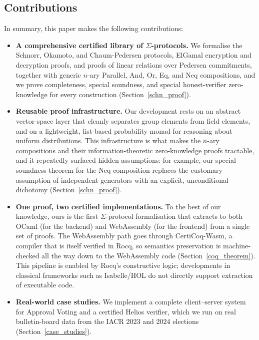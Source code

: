 \documentclass[sigconf,anonymous,review]{acmart}
\begin{document}
\subsection{Contributions}
In summary, this paper makes the following contributions:
\begin{itemize}
  \item \textbf{A comprehensive certified library of $\Sigma$-protocols.} We formalise the Schnorr, Okamoto, and Chaum-Pedersen protocols, ElGamal encryption and decryption proofs, and proofs of linear relations over Pedersen commitments, together with generic $n$-ary Parallel, And, Or, Eq, and Neq compositions, and we prove completeness, special soundness, and special honest-verifier zero-knowledge for every construction (Section~\ref{schn_proof}).
  \item \textbf{Reusable proof infrastructure.} Our development rests on an abstract vector-space layer that cleanly separates group elements from field elements, and on a lightweight, list-based probability monad for reasoning about uniform distributions. This infrastructure is what makes the $n$-ary compositions and their information-theoretic zero-knowledge proofs tractable, and it repeatedly surfaced hidden assumptions: for example, our special soundness theorem for the Neq composition replaces the customary assumption of independent generators with an explicit, unconditional dichotomy (Section~\ref{schn_proof}).
  \item \textbf{One proof, two certified implementations.} To the best of our knowledge, ours is the first $\Sigma$-protocol formalisation that extracts to both OCaml (for the backend) and WebAssembly (for the frontend) from a single set of proofs. The WebAssembly path goes through CertiCoq-Wasm, a compiler that is itself verified in Rocq, so semantics preservation is machine-checked all the way down to the WebAssembly code (Section~\ref{coq_theorem}). This pipeline is enabled by Rocq's constructive logic; developments in classical frameworks such as Isabelle/HOL do not directly support extraction of executable code.
  \item \textbf{Real-world case studies.} We implement a complete client--server system for Approval Voting and a certified Helios verifier, which we run on real bulletin-board data from the IACR 2023 and 2024 elections (Section~\ref{case_studies}).
\end{itemize}
\end{document}
